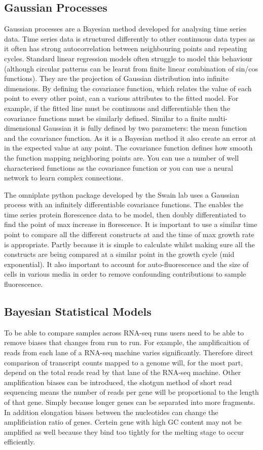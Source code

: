 \documentclass[../main.tex]{subfiles}
\begin{document}
\subsection{Gaussian Processes}
Gaussian processes are a Bayesian method developed for analysing time series data. Time series data is structured differently to other continuous data types as it often has strong autocorrelation between neighbouring points and repeating cycles. Standard linear regression models often struggle to model this behaviour (although circular patterns can be learnt from finite linear combination of sin/cos functions). They are the projection of Gaussian distribution into infinite dimensions. By defining the covariance function, which relates the value of each point to every other point, can a various attributes to the fitted model. For example, if the fitted line must be continuous and differentiable then the covariance functions must be similarly defined. Similar to a finite multi-dimensional Gaussian it is fully defined by two parameters:  the mean function and the covariance function. As it is a Bayesian method it also create an error at in the expected value at any point. The covariance function defines how smooth the function mapping neighboring points are. You can use a number of well characterised functions as the covariance function or you can use a neural network to learn complex connections. 

The omniplate python package developed by the Swain lab uses a Gaussian process with an infinitely differentiable covariance functions. The enables the time series protein florescence data to be model, then doubly differentiated to find the point of max increase in florescence. It is important to use a similar time point to compare all the different constructs at and the time of max growth rate is appropriate. Partly because it is simple to calculate whilst making sure all the constructs are being compared at a similar point in the growth cycle (mid exponential). It also important to account for auto-fluorescence and the size of cells in various media in order to remove confounding contributions to sample fluorescence.

\subsection{Bayesian Statistical Models}

To be able to compare samples across RNA-seq runs users need to be able to remove biases that changes from run to run. For example, the amplificaition of reads from each lane of a RNA-seq machine varies significantly. Therefore direct comparison of transcript counts mapped to a genome will, for the most part, depend on the total reads read by that lane of the RNA-seq machine.  Other amplification biases can be introduced, the shotgun method of short read sequencing means the number of reads per gene will be proportional to the length of that gene. Simply because longer genes can be separated into more fragments. In addition elongation biases between the nucleotides can change the amplificiation ratio of genes. Certein gene with high GC content may not be amplified as well because they bind too tightly for the melting stage to occur efficiently. 
\end{document}
